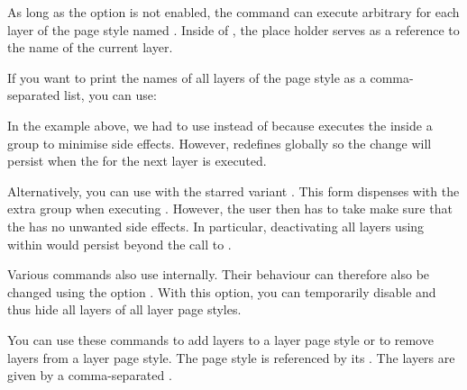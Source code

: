 \begin{Declaration}
\end{Declaration}
%
%
As long as the \KOMAScript{} option  is not
enabled, the  command can execute arbitrary
 for each layer of the page style named .
Inside of , the place holder  serves as a
reference to the name of the current layer.
\begin{Example}
  If you want to print the names of all layers of the 
  page style as a comma-separated list, you can use:
\begin{lstcode}
  \let\commaatlist\empty
  \ForEachLayerOfPageStyle{scrheadings}{%
    \commaatlist#1\gdef\commaatlist{, }}
\end{lstcode}
\end{Example}
In the example above, we had to use  instead
of  because  executes the
 inside a group to minimise side effects. However, 
redefines  globally so the change will persist when the
 for the next layer is executed.

Alternatively, you can use 
with the starred variant . This form dispenses
with the extra group when executing . However, the user then has
to take make sure that the  has no unwanted side effects. In
particular, deactivating all layers using
 within  would
persist beyond the call to .

Various  commands also use 
internally. Their behaviour can therefore also be changed using the
\KOMAScript{} option . With this option,
you can temporarily disable and thus hide all layers of all layer page
styles.%
\EndIndexGroup


\begin{Declaration}
\end{Declaration}
%
%
You can use these commands to add layers to a layer page style or to remove
layers from a layer page style. The page style is referenced by its
. The layers are given by a comma-separated
.

